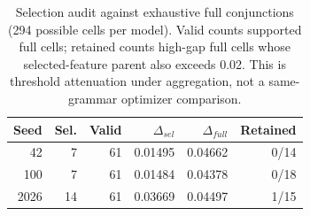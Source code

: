 \begin{table}[t]
\centering
\caption{Selection audit against exhaustive full conjunctions (294 possible cells per model). Valid counts supported full cells; retained counts high-gap full cells whose selected-feature parent also exceeds 0.02. This is threshold attenuation under aggregation, not a same-grammar optimizer comparison.}
\label{tab:selection-ablation}
\small
\begin{tabular}{rrrrrr}
\toprule
Seed & Sel. & Valid & $\Delta_{sel}$ & $\Delta_{full}$ & Retained \\
\midrule
42 & 7 & 61 & 0.01495 & 0.04662 & 0/14 \\
100 & 7 & 61 & 0.01484 & 0.04378 & 0/18 \\
2026 & 14 & 61 & 0.03669 & 0.04497 & 1/15 \\
\bottomrule
\end{tabular}
\end{table}
